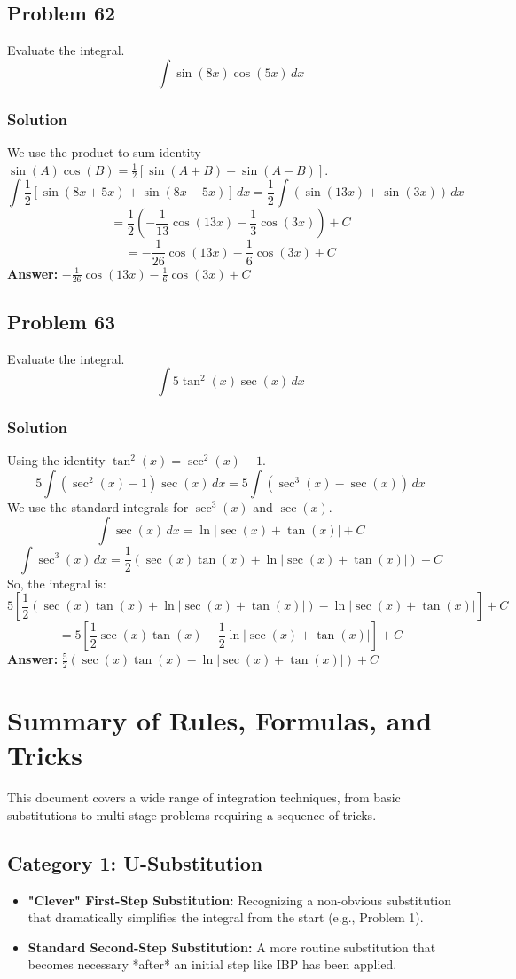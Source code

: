 \documentclass{article}
\begin{document}
\subsection{Problem 62}
Evaluate the integral.
$$ \int \sin(8x) \cos(5x) \,dx $$
\subsubsection*{Solution}
We use the product-to-sum identity $\sin(A)\cos(B) = \frac{1}{2}[\sin(A+B) + \sin(A-B)]$.
$$ \int \frac{1}{2}[\sin(8x+5x) + \sin(8x-5x)] \,dx = \frac{1}{2} \int (\sin(13x) + \sin(3x)) \,dx $$
$$ = \frac{1}{2} \left( -\frac{1}{13}\cos(13x) - \frac{1}{3}\cos(3x) \right) + C $$
$$ = -\frac{1}{26}\cos(13x) - \frac{1}{6}\cos(3x) + C $$
\textbf{Answer:} $ -\frac{1}{26}\cos(13x) - \frac{1}{6}\cos(3x) + C $
\subsection{Problem 63}
Evaluate the integral.
$$ \int 5 \tan^2(x) \sec(x) \,dx $$
\subsubsection*{Solution}
Using the identity $\tan^2(x) = \sec^2(x) - 1$.
$$ 5 \int (\sec^2(x) - 1) \sec(x) \,dx = 5 \int (\sec^3(x) - \sec(x)) \,dx $$
We use the standard integrals for $\sec^3(x)$ and $\sec(x)$.
$$ \int \sec(x) \,dx = \ln|\sec(x) + \tan(x)| + C $$
$$ \int \sec^3(x) \,dx = \frac{1}{2}(\sec(x)\tan(x) + \ln|\sec(x) + \tan(x)|) + C $$
So, the integral is:
$$ 5 \left[ \frac{1}{2}(\sec(x)\tan(x) + \ln|\sec(x) + \tan(x)|) - \ln|\sec(x) + \tan(x)| \right] + C $$
$$ = 5 \left[ \frac{1}{2}\sec(x)\tan(x) - \frac{1}{2}\ln|\sec(x) + \tan(x)| \right] + C $$
\textbf{Answer:} $ \frac{5}{2}(\sec(x)\tan(x) - \ln|\sec(x) + \tan(x)|) + C $



\newpage
\section{Summary of Rules, Formulas, and Tricks}
This document covers a wide range of integration techniques, from basic substitutions to multi-stage problems requiring a sequence of tricks.

\subsection*{Category 1: U-Substitution}
\begin{itemize}
    \item \textbf{"Clever" First-Step Substitution:} Recognizing a non-obvious substitution that dramatically simplifies the integral from the start (e.g., Problem 1).
    \item \textbf{Standard Second-Step Substitution:} A more routine substitution that becomes necessary *after* an initial step like IBP has been applied.
\end{itemize}
\end{document}
